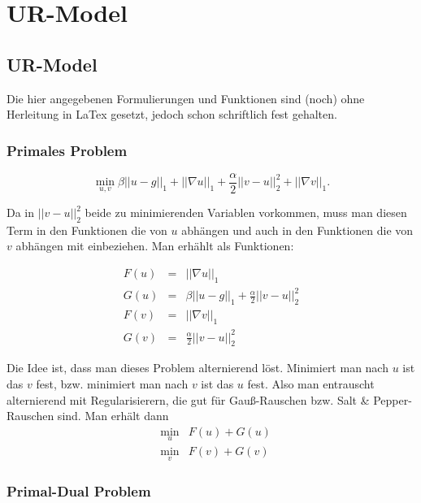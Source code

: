 \documentclass{scrreprt}
\begin{document}
\chapter{UR-Model} %
\label{cha:ur_model}

	\section{UR-Model} %
	\label{sec:ur_model}

		Die hier angegebenen Formulierungen und Funktionen sind (noch) ohne Herleitung in LaTex gesetzt, jedoch schon schriftlich fest gehalten.

		\subsection{Primales Problem} %
		\label{sub:primales_problem}
		
			\begin{equation}
				\min\limits_{u, v} \beta ||u - g||_{1} + ||\nabla u||_{1} + \frac{\alpha}{2} ||v - u||_{2}^{2} + ||\nabla v||_{1}.
			\end{equation}

		Da in $||v - u||_{2}^{2}$ beide zu minimierenden Variablen vorkommen, muss man diesen Term in den Funktionen die von $u$ abhängen und auch in den Funktionen die von $v$ abhängen mit einbeziehen. Man erhählt als Funktionen:

			\begin{eqnarray}
				F(u) &=& ||\nabla u||_{1} \\
				G(u) &=& \beta ||u - g||_{1} + \frac{\alpha}{2} ||v - u||_{2}^{2} \\
				F(v) &=& ||\nabla v||_{1} \\
				G(v) &=& \frac{\alpha}{2} ||v - u||_{2}^{2}
			\end{eqnarray}

		Die Idee ist, dass man dieses Problem alternierend löst. Minimiert man nach $u$ ist das $v$ fest, bzw. minimiert man nach $v$ ist das $u$ fest. Also man entrauscht alternierend mit Regularisierern, die gut für Gauß-Rauschen bzw. Salt \& Pepper-Rauschen sind. Man erhält dann
			\begin{eqnarray}
				&\min\limits_{u}& F(u) + G(u) \\
				&\min\limits_{v}& F(v) + G(v)
			\end{eqnarray}


		\subsection{Primal-Dual Problem} %
		\label{sub:primal_dual_problem}
\end{document}
